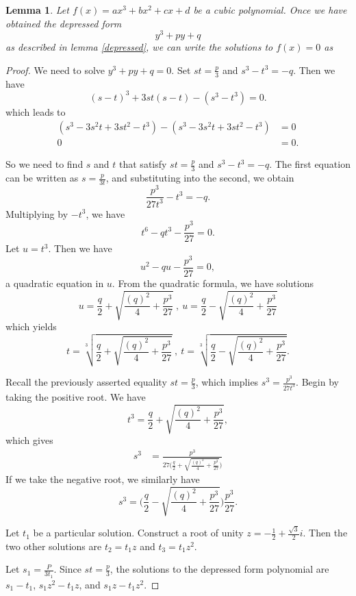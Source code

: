 \documentclass[12pt]{amsart}
\newtheorem{lem}{Lemma}
\theoremstyle{case}
\begin{document}
	\begin{lem}
		Let $f(x) = ax^3 + bx^2 + cx + d$ be a cubic polynomial. Once we have obtained the depressed form $$ y^3 + py + q $$ as described in lemma \ref{depressed}, we can write the solutions to $f(x) = 0$ as
	\end{lem}

	\begin{proof}
		We need to solve $y^3 + py + q = 0$. Set $st = \frac{p}{3}$ and $s^3 - t^3 = -q$. Then we have
		$$ (s-t)^3 + 3st(s-t) - (s^3 - t^3) = 0 . $$
		which leads to
		\begin{equation*}
		\begin{split} (s^3 - 3s^2t + 3st^2 - t^3) - (s^3 - 3s^2t + 3st^2 - t^3) & = 0 \\
		0 & = 0.
		\end{split}
		\end{equation*}
		
		So we need to find $s$ and $t$ that satisfy $st = \frac{p}{3}$ and $s^3 - t^3 = -q$. The first equation can be written as $s = \frac{p}{3t}$, and substituting into the second, we obtain
		$$ \frac{p^3}{27t^3} - t^3 = -q . $$
		Multiplying by $-t^3$, we have
		$$ t^6 - qt^3 - \frac{p^3}{27} = 0 . $$
		Let $u = t^3$. Then we have
		$$u^2 - qu - \frac{p^3}{27} = 0 , $$
		a quadratic equation in $u$. From the quadratic formula, we have solutions 
		$$u = \frac{q}{2} + \sqrt{\frac{(q)^2}{4} + \frac{p^3}{27}} \ , \ u = \frac{q}{2} - \sqrt{\frac{(q)^2}{4} + \frac{p^3}{27}} $$
		which yields
		$$t = \sqrt[3]{\frac{q}{2} + \sqrt{\frac{(q)^2}{4} + \frac{p^3}{27}}} \ , \ t = \sqrt[3]{\frac{q}{2} - \sqrt{\frac{(q)^2}{4} + \frac{p^3}{27}}} . $$
		
		Recall the previously asserted equality $st = \frac{p}{3}$, which implies $s^3 = \frac{p^3}{27t^3} $. Begin by taking the positive root. We have
		$$ t^3 = \frac{q}{2} + \sqrt{\frac{(q)^2}{4} + \frac{p^3}{27}} , $$
		which gives
		\begin{equation*}
		\begin{split}
			s^3 & = \frac{p^3}{27 \Big(\frac{q}{2} + \sqrt{\frac{(q)^2}{4} + \frac{p^3}{27}} \Big)}
		\end{split}
		\end{equation*}
		If we take the negative root, we similarly have
		$$ s^3 = \Big( \frac{q}{2} - \sqrt{\frac{(q)^2}{4} + \frac{p^3}{27}} \Big) \frac{p^3}{27} . $$
		
		Let $t_1$ be a particular solution. Construct a root of unity $z = - \frac{1}{2} + \frac{\sqrt{3}}{2}i$. Then the two other solutions are $t_2 = t_1 z$ and $t_3 = t_1 z^2$.
		
		Let $s_1 = \frac{P}{3t_1}$. Since $st = \frac{p}{3}$, the solutions to the depressed form polynomial are $s_1 - t_1$, $s_1 z^2 - t_1 z$, and $s_1 z - t_1 z^2$.
		
		
	
	\end{proof}
	
	
	
	
	
\end{document}
